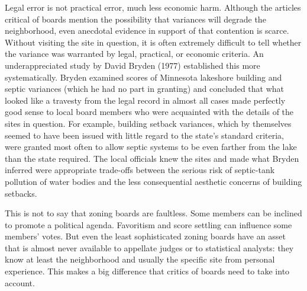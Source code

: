 Legal error is not practical error, much less economic harm. Although the
articles critical of boards mention the possibility that variances will degrade
the neighborhood, even anecdotal evidence in support of that contention is
scarce. Without visiting the site in question, it is often extremely difficult
to tell whether the variance was warranted by legal, practical, or economic
criteria. An underappreciated study by David Bryden (1977) established this more
systematically. Bryden examined scores of Minnesota lakeshore building and
septic variances (which he had no part in granting) and concluded that what
looked like a travesty from the legal record in almost all cases made perfectly
good sense to local board members who were acquainted with the details of the
sites in question. For example, building setback variances, which by themselves
seemed to have been issued with little regard to the state's standard criteria,
were granted most often to allow septic systems to be even farther from the lake
than the state required. The local officials knew the sites and made what Bryden
inferred were appropriate trade-offs between the serious risk of septic-tank
pollution of water bodies and the less consequential aesthetic concerns of
building setbacks.

This is not to say that zoning boards are faultless. Some members can be
inclined to promote a political agenda. Favoritism and score settling can
influence some members' votes. But even the least sophisticated zoning boards
have an asset that is almost never available to appellate judges or to
statistical analysts: they know at least the neighborhood and usually the
specific site from personal experience. This makes a big difference that critics
of boards need to take into account.
